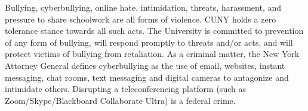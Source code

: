 Bullying, cyberbullying, online hate, intimidation, threats, harassment, and pressure to share schoolwork are all forms of violence. CUNY holds a zero tolerance stance towards all such acts. The University is committed to prevention of any form of bullying, will respond promptly to threats and/or acts, and will protect victims of bullying from retaliation.  As a criminal matter, the New York Attorney General defines cyberbullying as the use of email, websites, instant messaging, chat rooms, text messaging and digital cameras to antagonize and intimidate others. Disrupting a teleconferencing platform (such as Zoom/Skype/Blackboard Collaborate Ultra) is a federal crime.
